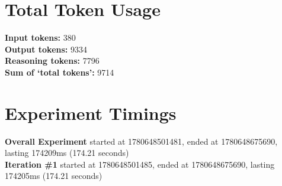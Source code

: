 \documentclass{article}
\begin{document}
\section*{Total Token Usage}
\textbf{Input tokens: }380
\\\textbf{Output tokens: }9334
\\\textbf{Reasoning tokens: }7796
\\\textbf{Sum of `total tokens': }9714
\section*{Experiment Timings}
\textbf{Overall Experiment} started at 1780648501481, ended at 1780648675690, lasting 174209ms (174.21 seconds)
\\\textbf{Iteration \#1} started at 1780648501485, ended at 1780648675690, lasting 174205ms (174.21 seconds)
\end{document}
